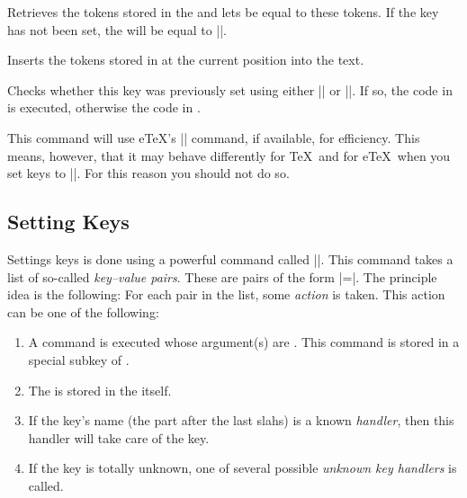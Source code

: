 \begin{command}{\pgfkeysgetvalue{}}
  Retrieves the tokens stored in the  and lets
   be equal to these tokens. If the key has
  not been set, the  will be equal to |\relax|. 
\begin{codeexample}[]
\helloworld
\end{codeexample}
\end{command}

\begin{command}{\pgfkeysinserttokens{}}
  Inserts the tokens stored in  at the current position
  into the text.

\begin{codeexample}[]
\end{codeexample}
\end{command}


\begin{command}{\pgfkeysifdefined{}}
  Checks whether this key was previously set using either
  |\pgfkeyssetvalue| or |\pgfkeyslet|. If so, the code in  is
  executed, otherwise the code in .

  This command will use e\TeX's |\ifcsname| command, if available, for
  efficiency. This means, however, that it may behave differently for
  \TeX\ and for e\TeX\ when you set keys to |\relax|. For this reason
  you should not do so. 
\begin{codeexample}[]
\end{codeexample}
\end{command}


\subsection{Setting Keys}

Settings keys is done using a powerful command called |\pgfkeys|. This
command takes a list of so-called \emph{key--value pairs}. These are
pairs of the form |=|. The principle idea is the
following: For each pair in the list, some \emph{action} is
taken. This action can be one of the following:

\begin{enumerate}
\item A command is executed whose argument(s) are . This
  command is stored in a special subkey of .
\item The  is stored in the  itself.
\item If the key's name (the part after the last slahs) is a known
  \emph{handler}, then this handler will take care of the key.
\item If the key is totally unknown, one of several possible
  \emph{unknown key handlers} is called. 
\end{enumerate}

